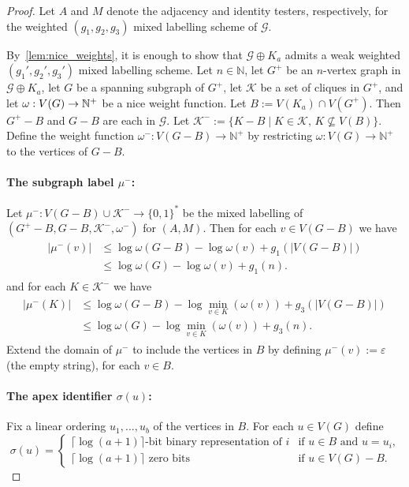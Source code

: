 \documentclass{patmorin}
\renewcommand{\le}{\leqslant}
\newcommand{\NN}{\mathbb{N}}
\begin{document}
\begin{proof}
    Let $A$ and $M$ denote the adjacency and identity testers, respectively, for the weighted $(g_1,g_2,g_3)$ mixed labelling scheme of $\mathcal{G}$.

    By~\cref{lem:nice_weights}, it is enough to show that $\mathcal{G}\oplus K_a$ admits a weak weighted $(g_1',g_2',g_3')$ mixed labelling scheme.
    Let $n\in \NN$,
    let $G^+$ be an $n$-vertex graph in $\mathcal{G}\oplus K_a$,
    let $G$ be a spanning subgraph of $G^+$,
    let $\mathcal{K}$ be a set of cliques in $G^+$, and
    let $\omega:V(G)\to\mathbb{N}^+$ be a nice weight function.
    Let $B:= V(K_a)\cap V(G^+)$.
    Then $G^+-B$ and $G-B$ are each in $\mathcal{G}$.
    Let $\mathcal{K}^-:=\{K-B \mid K\in\mathcal{K},\, K\not\subseteq V(B)\}$.
    Define the weight function $\omega^-:V(G-B)\to\NN^+$ by restricting $\omega:V(G)\to\NN^+$ to the vertices of $G-B$.

  \paragraph{\boldmath The subgraph label $\mu^-$:}
    Let $\mu^-:V(G-B)\cup\mathcal{K}^-\to \{0,1\}^*$ be the mixed labelling of $(G^+-B, G-B, \mathcal{K}^-,\omega^-)$ for $(A,M)$.
  Then for each $v\in V(G-B)$ we have
  \begin{align}
  \begin{split}
  |\mu^-(v)|
  &\le \log\omega(G-B) -\log\omega(v)+g_1(|V(G-B)|)\\
  &\le \log\omega(G)-\log\omega(v)+g_1(n).
  \end{split}
  \end{align}
  and for each $K\in\mathcal{K}^-$ we have
  \begin{align}
  \label{eq:split}
  \begin{split}
  |\mu^-(K)|
  &\le \log\omega(G-B)-\log\min_{v\in K}(\omega(v))+g_3(|V(G-B)|)\\
  &\le \log\omega(G)-\log\min_{v\in K}(\omega(v))+g_3(n).
  \end{split}
  \end{align}
  Extend the domain of $\mu^-$ to include the vertices in $B$ by defining $\mu^-(v):=\varepsilon$ (the empty string), for each $v\in B$.

  \paragraph{\boldmath The apex identifier $\sigma(u)$:}
  Fix a linear ordering $u_1,\ldots,u_{b}$ of the vertices in $B$.
  For each $u\in V(G)$ define
  \[
  \sigma(u) = \begin{cases}
  \textrm{$\lceil\log(a+1)\rceil$-bit binary representation of $i$}&\textrm{if $u\in B$ and $u=u_i$,}\\
  \textrm{$\lceil\log(a+1)\rceil$ zero bits}&\textrm{if $u\in V(G)-B$.}
  \end{cases}
  \]


\end{proof}
\end{document}
